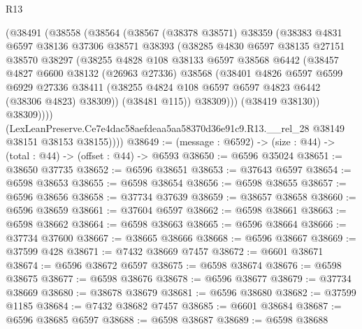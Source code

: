 \begin{lexlean}{R13}
\begin{coremodule}
            (@38491
              (@38558
                (@38564
                  (@38567
                    (@38378 @38571)
                    @38359
                    (@38383
                      @4831
                      @6597
                      @38136
                      @37306
                      @38571
                      @38393
                      (@38285
                        @4830
                        @6597
                        @38135
                        @27151
                        @38570
                        @38297
                        (@38255
                          @4828
                          @108
                          @38133
                          @6597
                          @38568
                          @6442
                          (@38457
                            @4827
                            @6600
                            @38132
                            (@26963 @27336)
                            @38568
                            (@38401
                              @4826
                              @6597
                              @6599
                              @6929
                              @27336
                              @38411
                              (@38255 @4824 @108 @6597 @6597 @4823 @6442 (@38306 @4823) @38309))
                            (@38481 @115))
                          @38309)))
                    (@38419 @38130))
                  @38309))))
          (LexLeanPreserve.Ce7e4dac58aefdeaa5aa58370d36e91c9.R13.__rel_28
            @38149
            @38151
            @38153
            @38155))))
@38649 := (message : @6592) -> (size : @44) -> (total : @44) -> (offset : @44) -> @6593
@38650 := @6596 @35024
@38651 := @38650 @37735
@38652 := @6596 @38651
@38653 := @37643 @6597
@38654 := @6598 @38653
@38655 := @6598 @38654
@38656 := @6598 @38655
@38657 := @6596 @38656
@38658 := @37734 @37639
@38659 := @38657 @38658
@38660 := @6596 @38659
@38661 := @37604 @6597
@38662 := @6598 @38661
@38663 := @6598 @38662
@38664 := @6598 @38663
@38665 := @6596 @38664
@38666 := @37734 @37600
@38667 := @38665 @38666
@38668 := @6596 @38667
@38669 := @37599 @428
@38671 := @7432 @38669 @7457
@38672 := @6601 @38671
@38674 := @6596 @38672 @6597
@38675 := @6598 @38674
@38676 := @6598 @38675
@38677 := @6598 @38676
@38678 := @6596 @38677
@38679 := @37734 @38669
@38680 := @38678 @38679
@38681 := @6596 @38680
@38682 := @37599 @1185
@38684 := @7432 @38682 @7457
@38685 := @6601 @38684
@38687 := @6596 @38685 @6597
@38688 := @6598 @38687
@38689 := @6598 @38688

\end{coremodule}
\end{lexlean}
